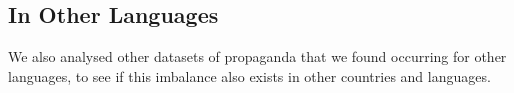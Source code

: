 






\subsection{In Other Languages}

We also analysed other datasets of propaganda that we found occurring for other languages, to see if this imbalance also exists in other countries and languages.


